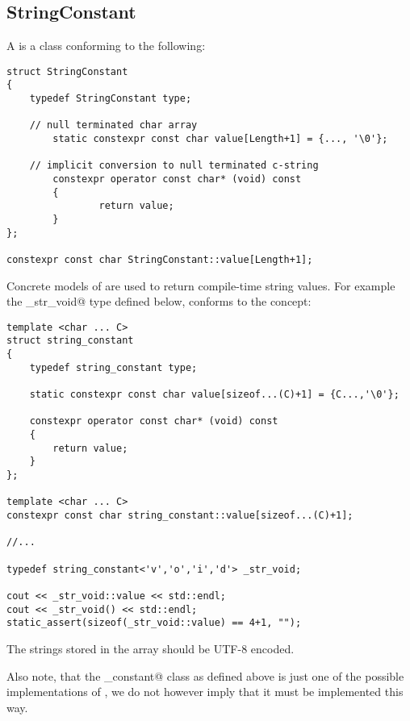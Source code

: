 \subsection{StringConstant}
\label{concept-StringConstant}

A  is a class conforming to the following:

\begin{verbatim}
struct StringConstant
{
	typedef StringConstant type;

	// null terminated char array
        static constexpr const char value[Length+1] = {..., '\0'};

	// implicit conversion to null terminated c-string
        constexpr operator const char* (void) const
        {
                return value;
        }
};

constexpr const char StringConstant::value[Length+1];
\end{verbatim}

Concrete models of  are used to return compile-time string values.
For example the \verb@_str_void@ type defined below, conforms to the 
concept:

\begin{verbatim}
template <char ... C>
struct string_constant
{
	typedef string_constant type;

	static constexpr const char value[sizeof...(C)+1] = {C...,'\0'};

	constexpr operator const char* (void) const
	{
		return value;
	}
};

template <char ... C>
constexpr const char string_constant::value[sizeof...(C)+1];

//...

typedef string_constant<'v','o','i','d'> _str_void;

cout << _str_void::value << std::endl;
cout << _str_void() << std::endl;
static_assert(sizeof(_str_void::value) == 4+1, "");
\end{verbatim}

The strings stored in the \verb@value@ array should be UTF-8 encoded.

Also note, that the \verb@string_constant@ class as defined above is just one of the
possible implementations of , we do not however imply
that it must be implemented this way.
